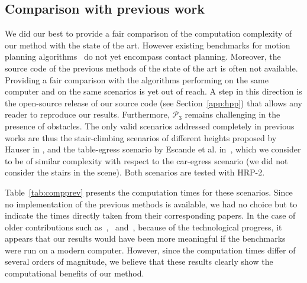 \documentclass[journal]{IEEEtran}
\begin{document}
\subsection{Comparison with previous work} \label{sec:compa}
We did our best to provide a fair comparison of the computation complexity of our method with the state of the art. 
However existing benchmarks for motion planning algorithms~\cite{moll2014extensible} do not yet encompass contact planning.
Moreover, the source code of the previous methods of the state of the art is often not available.
Providing a fair comparison with the algorithms performing on the same computer and on the same scenarios is yet out of reach.
A step in this direction is the open-source release of our source code (see Section~\ref{app:hpp}) that allows any reader to reproduce our results.
Furthermore, $\mathcal{P}_3$ remains challenging in the presence of obstacles. The only valid scenarios addressed completely in previous works are thus the stair-climbing scenarios of different heights proposed by Hauser in \cite{Hauser06usingmotion}, and the table-egress scenario by Escande et al. in~\cite{DBLP:conf/iser/EscandeKMG08}, which we consider to be of similar complexity with respect to the car-egress scenario (we did not consider the stairs in the scene). Both scenarios are tested with HRP-2.

Table~\ref{tab:compprev} presents the computation times for these scenarios. Since no implementation of the previous methods is available, we had no choice but to indicate the times directly taken from their corresponding papers.
In the case of older contributions such as~\cite{Hauser06usingmotion},~\cite{DBLP:conf/iser/EscandeKMG08} and~\cite{Bouyarmane2009}, because of the technological progress, it appears that our results would have been more meaningful if the benchmarks were run on a modern computer. However, since the computation times differ of several orders of magnitude, we believe that these results clearly show the computational benefits of our method.
\end{document}
